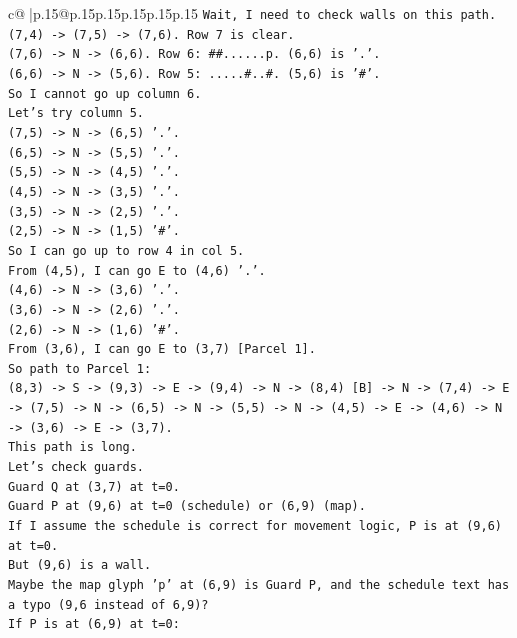 \documentclass{article}
\begin{document}
{\begin{supertabular}{c@{$\;$}|p{.15\linewidth}@{}p{.15\linewidth}p{.15\linewidth}p{.15\linewidth}p{.15\linewidth}p{.15\linewidth}}
{{{\texttt{Wait, I need to check walls on this path.} \\
\texttt{(7,4) {-}> (7,5) {-}> (7,6). Row 7 is clear.} \\
\texttt{(7,6) {-}> N {-}> (6,6). Row 6: \#\#......p. (6,6) is '.'.} \\
\texttt{(6,6) {-}> N {-}> (5,6). Row 5: .....\#..\#. (5,6) is '\#'.} \\
\texttt{So I cannot go up column 6.} \\
\texttt{Let's try column 5.} \\
\texttt{(7,5) {-}> N {-}> (6,5) '.'.} \\
\texttt{(6,5) {-}> N {-}> (5,5) '.'.} \\
\texttt{(5,5) {-}> N {-}> (4,5) '.'.} \\
\texttt{(4,5) {-}> N {-}> (3,5) '.'.} \\
\texttt{(3,5) {-}> N {-}> (2,5) '.'.} \\
\texttt{(2,5) {-}> N {-}> (1,5) '\#'.} \\
\texttt{So I can go up to row 4 in col 5.} \\
\texttt{From (4,5), I can go E to (4,6) '.'.} \\
\texttt{(4,6) {-}> N {-}> (3,6) '.'.} \\
\texttt{(3,6) {-}> N {-}> (2,6) '.'.} \\
\texttt{(2,6) {-}> N {-}> (1,6) '\#'.} \\
\texttt{From (3,6), I can go E to (3,7) {[}Parcel 1{]}.} \\
\texttt{So path to Parcel 1:} \\
\texttt{(8,3) {-}> S {-}> (9,3) {-}> E {-}> (9,4) {-}> N {-}> (8,4) {[}B{]} {-}> N {-}> (7,4) {-}> E {-}> (7,5) {-}> N {-}> (6,5) {-}> N {-}> (5,5) {-}> N {-}> (4,5) {-}> E {-}> (4,6) {-}> N {-}> (3,6) {-}> E {-}> (3,7).} \\
\texttt{This path is long.} \\
\texttt{Let's check guards.} \\
\texttt{Guard Q at (3,7) at t=0.} \\
\texttt{Guard P at (9,6) at t=0 (schedule) or (6,9) (map).} \\
\texttt{If I assume the schedule is correct for movement logic, P is at (9,6) at t=0.} \\
\texttt{But (9,6) is a wall.} \\
\texttt{Maybe the map glyph 'p' at (6,9) is Guard P, and the schedule text has a typo (9,6 instead of 6,9)?} \\
\texttt{If P is at (6,9) at t=0:} \\
}}}
\end{supertabular}}
\end{document}
